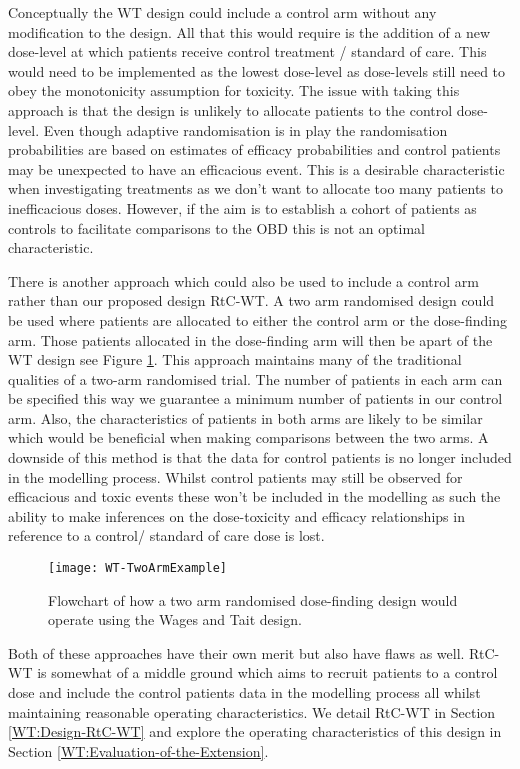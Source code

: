 Conceptually the WT design could include a control arm without any modification to the design. All that this would require is the addition of a new dose-level at which patients receive control treatment / standard of care. This would need to be implemented as the lowest dose-level as dose-levels still need to obey the monotonicity assumption for toxicity. The issue with taking this approach is that the design is unlikely to allocate patients to the control dose-level. Even though adaptive randomisation is in play the randomisation probabilities are based on estimates of efficacy probabilities and control patients may be unexpected to have an efficacious event. This is a desirable characteristic when investigating treatments as we don't want to allocate too many patients to inefficacious doses. However, if the aim is to establish a cohort of patients as controls to facilitate comparisons to the OBD this is not an optimal characteristic. 

There is another approach which could also be used to include a control arm rather than our proposed design RtC-WT. A two arm randomised design could be used where patients are allocated to either the control arm or the dose-finding arm. Those patients allocated in the dose-finding arm will then be apart of the WT design see Figure \ref{fig_wt:TwoArmExample}. This approach maintains many of the traditional qualities of a two-arm randomised trial. The number of patients in each arm can be specified this way we guarantee a minimum number of patients in our control arm. Also, the characteristics of patients in both arms are likely to be similar which would be beneficial when making comparisons between the two arms. A downside of this method is that the data for control patients is no longer included in the modelling process. Whilst control patients may still be observed for efficacious and toxic events these won't be included in the modelling as such the ability to make inferences on the dose-toxicity and efficacy relationships in reference to a control/ standard of care dose is lost. 

\begin{figure}[!h]
	\centering
	\caption[Flowchart of a two arm randomised dose-finding trial.]{Flowchart of how a two arm randomised dose-finding design would operate using the Wages and Tait design.}
	\label{fig_wt:TwoArmExample}
	\texttt{[image: WT-TwoArmExample]}
\end{figure}

Both of these approaches have their own merit but also have flaws as well. RtC-WT is somewhat of a middle ground which aims to recruit patients to a control dose and include the control patients data in the modelling process all whilst maintaining reasonable operating characteristics. We detail RtC-WT in Section \ref{WT:Design-RtC-WT} and explore the operating characteristics of this design in Section \ref{WT:Evaluation-of-the-Extension}.


